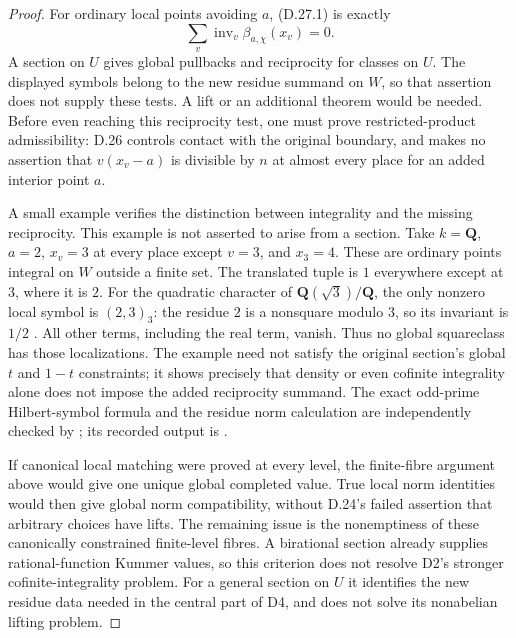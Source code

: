 \begin{proof}
For ordinary local points avoiding $a$, (D.27.1) is exactly
\[
         \sum_v\operatorname{inv}_v\beta_{a,\chi}(x_v)=0.
\]
A section on $U$ gives global pullbacks and reciprocity for
classes on $U$. The displayed symbols belong to the new
residue summand on $W$, so that assertion does not supply
these tests. A lift or an additional theorem would be
needed. Before even reaching this reciprocity test, one
must prove restricted-product admissibility: D.26 controls
contact with the original boundary, and makes no assertion
that $v(x_v-a)$ is divisible by $n$ at almost every place
for an added interior point $a$.

A small example verifies the distinction between integrality
and the missing reciprocity. This example is not asserted
to arise from a section. Take $k=\mathbf Q$, $a=2$,
$x_v=3$ at every place except $v=3$, and $x_3=4$.
These are ordinary points integral on $W$ outside a finite
set. The translated tuple is $1$ everywhere except at $3$,
where it is $2$. For the quadratic character of
$\mathbf Q(\sqrt3)/\mathbf Q$, the only nonzero local
symbol is $(2,3)_3$: the residue $2$ is a nonsquare modulo
$3$, so its invariant is $1/2$
\cite[example following Corollary 3.6.3]{D_ColliotTheleneSkorobogatov2019}.
All other terms, including the real term, vanish. Thus no
global squareclass has those localizations. The example
need not satisfy the original section's global $t$ and
$1-t$ constraints; it shows precisely that density or even
cofinite integrality alone does not impose the added
reciprocity summand. The exact odd-prime Hilbert-symbol
formula and the residue norm calculation are independently
checked by ;
its recorded output is
.

If canonical local matching were proved at every level,
the finite-fibre argument above would give one unique global
completed value. True local norm identities would then give
global norm compatibility, without D.24's failed assertion
that arbitrary choices have lifts. The remaining issue is
the nonemptiness of these canonically constrained finite-level
fibres. A birational section already supplies rational-function
Kummer values, so this criterion does not resolve D2's
stronger cofinite-integrality problem. For a general section
on $U$ it identifies the new residue data needed in the
central part of D4, and does not solve its nonabelian lifting
problem.
\end{proof}
